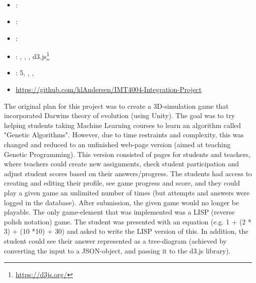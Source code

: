 \subsection[Integration project]{}
\label{sec:key}
\begin{itemize} 
	\item {}: 
	\item {}: 
	\item {}: 
	\item {}: , , , d3.js\footnote{\url{https://d3js.org/}}
	\item {}: 5, , , 
	\item {} \url{https://github.com/klAndersen/IMT4004-Integration-Project}
\end{itemize} 
The original plan for this project was to create a 3D-simulation game that incorporated Darwins theory of evolution (using Unity). 
The goal was to try helping students taking Machine Learning courses to learn an algorithm called "Genetic Algorithms". 
However, due to time restraints and complexity, this was changed and reduced to an unfinished web-page version (aimed at teaching Genetic Programming).
\vspace{0.5em}\newline
This version consisted of pages for students and teachers, where teachers could create new assignments, 
check student participation and adjust student scores based on their answers/progress. 
The students had access to creating and editing their profile, see game progress and score, and they could play a given game an unlimited number of times 
(but attempts and answers were logged in the database). 
After submission, the given game would no longer be playable.
\vspace{0.5em}\newline
The only game-element that was implemented was a LISP (reverse polish notation) game. 
The student was presented with an equation (e.g. 1 + (2 * 3) + (10 *10) + 30) and asked to write the LISP version of this. 
In addition, the student could see their answer represented as a tree-diagram (achieved by converting the input to a JSON-object, and passing it to the d3.js library).

